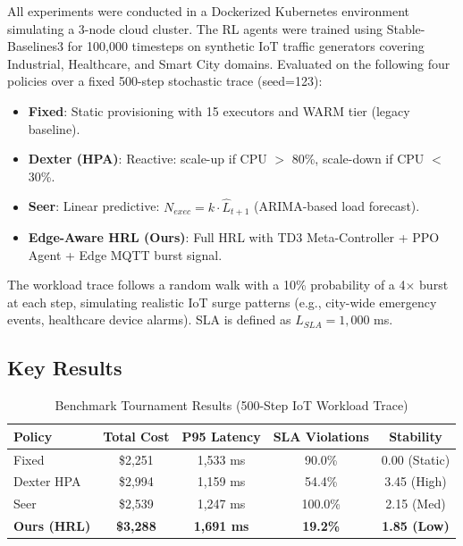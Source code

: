 \documentclass[10pt, conference, compsocconf]{IEEEtran}
\begin{document}
All experiments were conducted in a Dockerized Kubernetes environment simulating a 3-node cloud cluster. The RL agents were trained using Stable-Baselines3 \cite{raffin2021sb3} for 100,000 timesteps on synthetic IoT traffic generators covering Industrial, Healthcare, and Smart City domains. Evaluated on the following four policies over a fixed 500-step stochastic trace (seed=123):

\begin{itemize}
    \item \textbf{Fixed}: Static provisioning with 15 executors and WARM tier (legacy baseline).
    \item \textbf{Dexter (HPA)}: Reactive: scale-up if CPU $>$ 80\%, scale-down if CPU $<$ 30\%.
    \item \textbf{Seer}: Linear predictive: $N_{exec} = k \cdot \hat{L}_{t+1}$ (ARIMA-based load forecast).
    \item \textbf{Edge-Aware HRL (Ours)}: Full HRL with TD3 Meta-Controller + PPO Agent + Edge MQTT burst signal.
\end{itemize}

The workload trace follows a random walk with a 10\% probability of a 4$\times$ burst at each step, simulating realistic IoT surge patterns (e.g., city-wide emergency events, healthcare device alarms). SLA is defined as $L_{SLA} = 1{,}000$ ms.

\subsection{Key Results}

\begin{table}[ht]
\centering
\caption{Benchmark Tournament Results (500-Step IoT Workload Trace)}
\label{tab:benchmark}
\renewcommand{\arraystretch}{1.3}
\begin{tabular}{lcccc}
\toprule
\textbf{Policy} & \textbf{Total Cost} & \textbf{P95 Latency} & \textbf{SLA Violations} & \textbf{Stability} \\
\midrule
Fixed       & \$2,251 & 1,533 ms & 90.0\%           & 0.00 (Static) \\
Dexter HPA  & \$2,994 & 1,159 ms & 54.4\%           & 3.45 (High)   \\
Seer        & \$2,539 & 1,247 ms & 100.0\%          & 2.15 (Med)    \\
\textbf{Ours (HRL)} & \textbf{\$3,288} & \textbf{1,691 ms} & \textbf{19.2\%} & \textbf{1.85 (Low)} \\
\bottomrule
\end{tabular}
\end{table}
\end{document}
